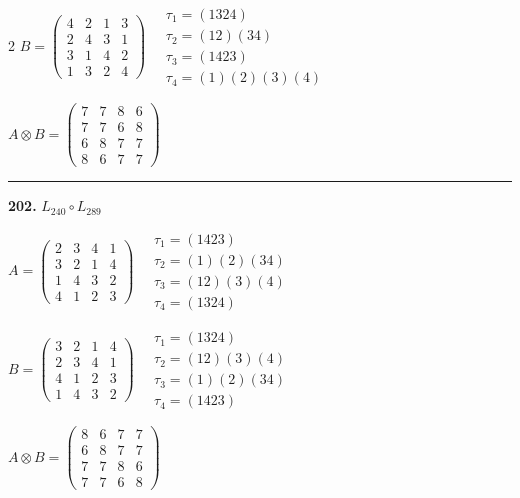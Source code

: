 \begin{multicols}{2}
$B = \begin{pmatrix} 4 & 2 & 1 & 3 \\ 2 & 4 & 3 & 1 \\ 3 & 1 & 4 & 2 \\ 1 & 3 & 2 & 4 \end{pmatrix} \quad \begin{matrix} \tau_{1}=(1 3 2 4) \\ \tau_{2}=(1 2)(3 4) \\ \tau_{3}=(1 4 2 3) \\ \tau_{4}=(1)(2)(3)(4) \end{matrix}$

$A \otimes B = \begin{pmatrix} 7 & 7 & 8 & 6 \\ 7 & 7 & 6 & 8 \\ 6 & 8 & 7 & 7 \\ 8 & 6 & 7 & 7 \end{pmatrix}$

\vspace{0.3em}
\hrule
\vspace{0.3em}

\noindent\textbf{202.} $L_{240} \circ L_{289}$

$A = \begin{pmatrix} 2 & 3 & 4 & 1 \\ 3 & 2 & 1 & 4 \\ 1 & 4 & 3 & 2 \\ 4 & 1 & 2 & 3 \end{pmatrix} \quad \begin{matrix} \tau_{1}=(1 4 2 3) \\ \tau_{2}=(1)(2)(3 4) \\ \tau_{3}=(1 2)(3)(4) \\ \tau_{4}=(1 3 2 4) \end{matrix}$

$B = \begin{pmatrix} 3 & 2 & 1 & 4 \\ 2 & 3 & 4 & 1 \\ 4 & 1 & 2 & 3 \\ 1 & 4 & 3 & 2 \end{pmatrix} \quad \begin{matrix} \tau_{1}=(1 3 2 4) \\ \tau_{2}=(1 2)(3)(4) \\ \tau_{3}=(1)(2)(3 4) \\ \tau_{4}=(1 4 2 3) \end{matrix}$

$A \otimes B = \begin{pmatrix} 8 & 6 & 7 & 7 \\ 6 & 8 & 7 & 7 \\ 7 & 7 & 8 & 6 \\ 7 & 7 & 6 & 8 \end{pmatrix}$


\end{multicols}
